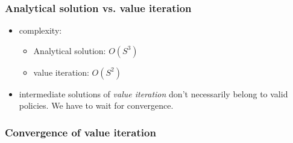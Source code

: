 \begin{frame}\frametitle{Analytical solution vs. value iteration}


\begin{itemize}
\item complexity: 
\begin{itemize}
\item Analytical solution: $O(S^{3})$
\item value iteration: $O(S^{2})$
\end{itemize}   
\item intermediate solutions of \emph{value iteration} don't necessarily belong to valid policies. We have to wait for convergence.
\end{itemize}

\end{frame}

\newpage

\subsubsection{Convergence of value iteration}


